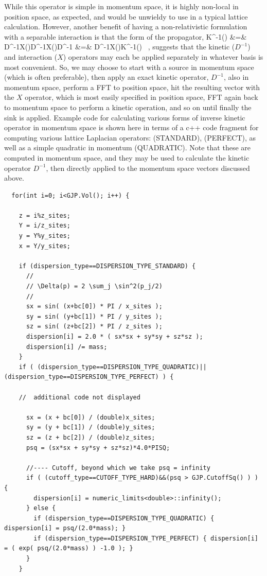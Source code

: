 While this operator is simple in momentum space, it is highly non-local in position space, as expected, and would be unwieldy to use in a typical lattice calculation. However, another benefit of having a non-relativistic formulation with a separable interaction is that the form of the propagator, 
\beq
K^{-1}(\tau) &=& D^{-1}X(\tau)D^{-1}X()\cdots D^{-1} \cr
&=& D^{-1}X(\tau)K^{-1}() \ ,
\eeq
suggests that the kinetic ($D^{-1}$) and interaction ($X$) operators may each be applied separately in whatever basis is most convenient. So, we may choose to start with a source in momentum space (which is often preferable), then apply an exact kinetic operator, $D^{-1}$, also in momentum space, perform a FFT to position space, hit the resulting vector with the $X$ operator, which is most easily specified in position space, FFT again back to momentum space to perform a kinetic operation, and so on until finally the sink is applied. Example code for calculating various forms of inverse kinetic operator in momentum space is shown here in terms of a c++ code fragment for computing various lattice Laplacian operators:  (STANDARD),  (PERFECT), as well as a simple quadratic in momentum (QUADRATIC). Note that these are computed in momentum space, and they may be used to calculate the kinetic operator $D^{-1}$, then directly applied to the momentum space vectors discussed above.
\begin{lstlisting}
  for(int i=0; i<GJP.Vol(); i++) {
 
    z = i%z_sites;
    Y = i/z_sites;
    y = Y%y_sites;
    x = Y/y_sites;

    if (dispersion_type==DISPERSION_TYPE_STANDARD) {
      //
      // \Delta(p) = 2 \sum_j \sin^2(p_j/2)
      //
      sx = sin( (x+bc[0]) * PI / x_sites );
      sy = sin( (y+bc[1]) * PI / y_sites );
      sz = sin( (z+bc[2]) * PI / z_sites );
      dispersion[i] = 2.0 * ( sx*sx + sy*sy + sz*sz ); 
      dispersion[i] /= mass; 
    }
    if ( (dispersion_type==DISPERSION_TYPE_QUADRATIC)||(dispersion_type==DISPERSION_TYPE_PERFECT) ) {

    //  additional code not displayed

      sx = (x + bc[0]) / (double)x_sites;
      sy = (y + bc[1]) / (double)y_sites;
      sz = (z + bc[2]) / (double)z_sites;
      psq = (sx*sx + sy*sy + sz*sz)*4.0*PISQ;

      //---- Cutoff, beyond which we take psq = infinity
      if ( (cutoff_type==CUTOFF_TYPE_HARD)&&(psq > GJP.CutoffSq() ) ) {
        dispersion[i] = numeric_limits<double>::infinity();
      } else {
        if (dispersion_type==DISPERSION_TYPE_QUADRATIC) { dispersion[i] = psq/(2.0*mass); }
        if (dispersion_type==DISPERSION_TYPE_PERFECT) { dispersion[i] = ( exp( psq/(2.0*mass) ) -1.0 ); }
      }
    }
\end{lstlisting}



